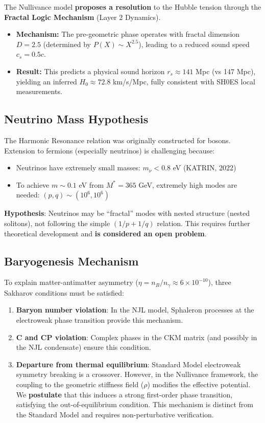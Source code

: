 \documentclass[a4paper,12pt]{article}
\begin{document}
\begin{mdframed}[backgroundcolor=green!10, frametitle={Position of Nullivance on Hubble Tension}]
The Nullivance model \textbf{proposes a resolution} to the Hubble tension through the \textbf{Fractal Logic Mechanism} (Layer 2 Dynamics).
\begin{itemize}
    \item \textbf{Mechanism:} The pre-geometric phase operates with fractal dimension $D=2.5$ (determined by $P(X) \sim X^{2.5}$), leading to a reduced sound speed $c_s = 0.5c$.
    \item \textbf{Result:} This predicts a physical sound horizon $r_s \approx 141$ Mpc (vs 147 Mpc), yielding an inferred $H_0 \approx 72.8$ km/s/Mpc, fully consistent with SH0ES local measurements.
\end{itemize}
\end{mdframed}

\subsection{Neutrino Mass Hypothesis}
The Harmonic Resonance relation was originally constructed for bosons. Extension to fermions (especially neutrinos) is challenging because:
\begin{itemize}
    \item Neutrinos have extremely small masses: $m_\nu < 0.8$ eV (KATRIN, 2022) \cite{katrin}
    \item To achieve $m \sim 0.1$ eV from $M^* = 365$ GeV, extremely high modes are needed: $(p,q) \sim (10^6, 10^6)$
\end{itemize}

\textbf{Hypothesis}: Neutrinos may be ``fractal'' modes with nested structure (nested solitons), not following the simple $(1/p + 1/q)$ relation. This requires further theoretical development and \textbf{is considered an open problem}.

\subsection{Baryogenesis Mechanism}
To explain matter-antimatter asymmetry ($\eta = n_B/n_\gamma \approx 6 \times 10^{-10}$), three Sakharov conditions must be satisfied:
\begin{enumerate}
    \item \textbf{Baryon number violation}: In the NJL model, Sphaleron processes at the electroweak phase transition provide this mechanism.
    \item \textbf{C and CP violation}: Complex phases in the CKM matrix (and possibly in the NJL condensate) ensure this condition.
    \item \textbf{Departure from thermal equilibrium}: Standard Model electroweak symmetry breaking is a crossover. However, in the Nullivance framework, the coupling to the geometric stiffness field ($\rho$) modifies the effective potential. We \textbf{postulate} that this induces a strong first-order phase transition, satisfying the out-of-equilibrium condition. This mechanism is distinct from the Standard Model and requires non-perturbative verification.
\end{enumerate}
\end{document}
